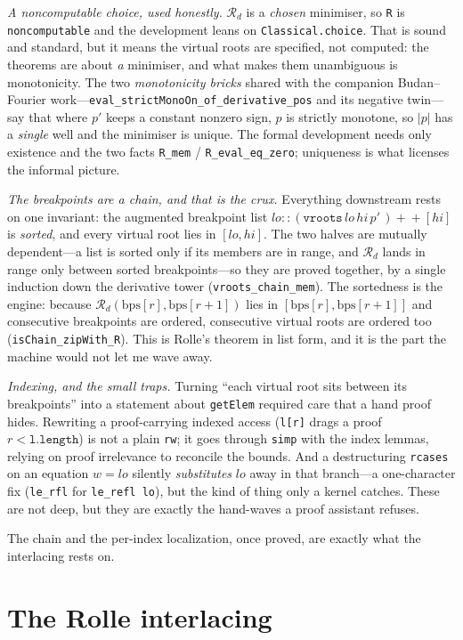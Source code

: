 \documentclass[11pt]{article}
\newcommand{\lean}[1]{\texttt{#1}}
\newcommand{\Rd}{\mathcal{R}}
\begin{document}
\emph{A noncomputable choice, used honestly.} $\Rd_d$ is a \emph{chosen} minimiser, so \lean{R} is
\lean{noncomputable} and the development leans on \lean{Classical.choice}. That is sound and standard,
but it means the virtual roots are specified, not computed: the theorems are about \emph{a} minimiser,
and what makes them unambiguous is monotonicity. The two \emph{monotonicity bricks} shared with the
companion Budan--Fourier work---\lean{eval\_strictMonoOn\_of\_derivative\_pos} and its negative
twin---say that where $p'$ keeps a constant nonzero sign, $p$ is strictly monotone, so $|p|$ has a
\emph{single} well and the minimiser is unique. The formal development needs only existence and the
two facts \lean{R\_mem} / \lean{R\_eval\_eq\_zero}; uniqueness is what licenses the informal picture.

\emph{The breakpoints are a chain, and that is the crux.} Everything downstream rests on one
invariant: the augmented breakpoint list $lo::(\lean{vroots}\,lo\,hi\,p'\,)+\!\!+[hi]$ is
\emph{sorted}, and every virtual root lies in $[lo,hi]$. The two halves are mutually dependent---a
list is sorted only if its members are in range, and $\Rd_d$ lands in range only between sorted
breakpoints---so they are proved together, by a single induction down the derivative tower
(\lean{vroots\_chain\_mem}). The sortedness is the engine: because $\Rd_d(\mathrm{bps}[r],
\mathrm{bps}[r+1])$ lies in $[\mathrm{bps}[r],\mathrm{bps}[r+1]]$ and consecutive breakpoints are
ordered, consecutive virtual roots are ordered too (\lean{isChain\_zipWith\_R}). This is Rolle's
theorem in list form, and it is the part the machine would not let me wave away.

\emph{Indexing, and the small traps.} Turning ``each virtual root sits between its breakpoints'' into
a statement about \lean{getElem} required care that a hand proof hides. Rewriting a proof-carrying
indexed access (\lean{l[r]} drags a proof $r<\lean{l.length}$) is not a plain \lean{rw}; it goes
through \lean{simp} with the index lemmas, relying on proof irrelevance to reconcile the bounds. And
a destructuring \lean{rcases} on an equation $w=lo$ silently \emph{substitutes} $lo$ away in that
branch---a one-character fix (\lean{le\_rfl} for \lean{le\_refl lo}), but the kind of thing only a
kernel catches. These are not deep, but they are exactly the hand-waves a proof assistant refuses.

The chain and the per-index localization, once proved, are exactly what the interlacing rests on.

\section{The Rolle interlacing}\label{sec:q4}
\end{document}
